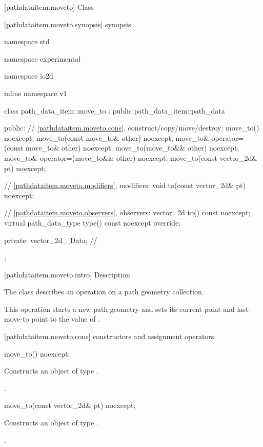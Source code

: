  [pathdataitem.moveto] {Class }

 [pathdataitem.moveto.synopsis] { synopsis}

\begin{codeblock}
namespace std { namespace experimental { namespace io2d { inline namespace v1 {
  class path_data_item::move_to : public path_data_item::path_data {
  public:
    // \ref{pathdataitem.moveto.cons}, construct/copy/move/destroy:
    move_to() noexcept;
    move_to(const move_to& other) noexcept;
    move_to& operator=(const move_to& other) noexcept;
    move_to(move_to&& other) noexcept;
    move_to& operator=(move_to&& other) noexcept;
    move_to(const vector_2d& pt) noexcept;

    // \ref{pathdataitem.moveto.modifiers}, modifiers:
    void to(const vector_2d& pt) noexcept;

    // \ref{pathdataitem.moveto.observers}, observers:
    vector_2d to() const noexcept;
    virtual path_data_type type() const noexcept override;
    
  private:
    vector_2d _Data; // \expos
  };
} } } }
\end{codeblock}

 [pathdataitem.moveto.intro] { Description}

\pnum
{}
The class  describes an operation on a path geometry collection.

\pnum
This operation starts a new path geometry and sets its current point and last-move-to point to the value of .

 [pathdataitem.moveto.cons] { constructors and assignment operators}

\begin{itemdecl}
    move_to() noexcept;
\end{itemdecl}
\begin{itemdescr}
	\pnum
	\effects
	Constructs an object of type .
	
	\pnum
	\postconditions
	.
\end{itemdescr}

\begin{itemdecl}
    move_to(const vector_2d& pt) noexcept;
\end{itemdecl}
\begin{itemdescr}
	\pnum
	\effects
	Constructs an object of type .
	
	\pnum
	\postconditions
	.
\end{itemdescr}

